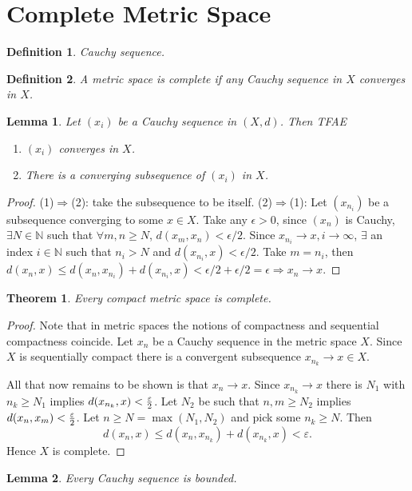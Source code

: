 \documentclass[article,11pt, reqno]{article}
\newtheorem*{theorem}{Theorem}
\newtheorem*{lemma}{Lemma}
\newtheorem*{definition}{Definition}
\theoremstyle{remark}
\newcommand{\Ra}{\Rightarrow}
\newcommand{\ra}{\rightarrow}
\newcommand{\<}{\langle}
\renewcommand{\>}{\rangle}
\begin{document}
\section{Complete Metric Space}
\begin{definition}
    Cauchy sequence.
\end{definition}
\begin{definition}
    A metric space is complete if any Cauchy sequence in $X$ converges in $X$.
\end{definition}
\begin{lemma}
    Let $(x_i)$ be a Cauchy sequence in $(X,d)$. Then TFAE
    \begin{enumerate}
        \item $(x_i)$ converges in $X$.
        \item There is a converging subsequence of $(x_i)$ in $X$.
    \end{enumerate}
\end{lemma}
\begin{proof}
    (1)$\Ra$(2): take the subsequence to be itself. (2)$\Ra$(1): Let $(x_{n_i})$ be a subsequence converging to some $x\in X$. Take any $\epsilon>0$, since $(x_n)$ is Cauchy, $\exists N\in \mathbb{N}$ such that $\forall m,n\geq N$, $d(x_m,x_n)<\epsilon/2$. Since $x_{n_i}\ra x, i\ra \infty$, $\exists$ an index $i\in\mathbb{N}$ such that $n_{i}>N$ and $d(x_{n_i},x)<\epsilon/2$. Take $m=n_i$, then $d(x_n,x)\leq d(x_n,x_{n_i})+d(x_{n_i},x)<\epsilon/2+\epsilon/2=\epsilon\Ra x_n\ra x$.
\end{proof}
\begin{theorem}
    Every compact metric space is complete. 
\end{theorem}
\begin{proof}
    Note that in metric spaces the notions of compactness and sequential compactness coincide. Let $x_n$ be a Cauchy sequence in the metric space $X$. Since $X$ is sequentially compact there is a convergent subsequence $x_{n_k}\to x \in X$. 
    
    All that now remains to be shown is that $x_n \to x$. Since $x_{n_k}\to x$ there is $N_1$ with $n_k \ge N_1$ implies $d(x_{n_k},x)<{\varepsilon\over 2}$. Let $N_2$ be such that $n,m\ge N_2$ implies $d(x_n,x_m)<{\varepsilon \over 2}$. 
    Let $n\geq N=\max(N_1,N_2)$ and pick some $n_k\geq N$. Then
    $$ d(x_n,x)\le d(x_n,x_{n_k})+d(x_{n_k},x)<\varepsilon.$$
    Hence $X$ is complete. 
\end{proof}
\begin{lemma}
    Every Cauchy sequence is bounded.
\end{lemma}
\end{document}
